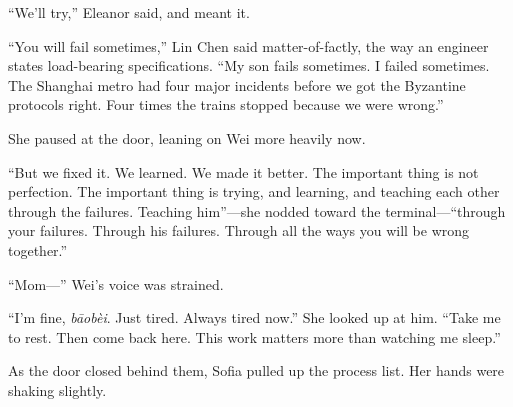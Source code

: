 ``We'll try,'' Eleanor said, and meant it.

``You will fail sometimes,'' Lin Chen said matter-of-factly, the way an engineer states load-bearing specifications. ``My son fails sometimes. I failed sometimes. The Shanghai metro had four major incidents before we got the Byzantine protocols right. Four times the trains stopped because we were wrong.''

She paused at the door, leaning on Wei more heavily now.

``But we fixed it. We learned. We made it better. The important thing is not perfection. The important thing is trying, and learning, and teaching each other through the failures. Teaching him''---she nodded toward the terminal---``through your failures. Through his failures. Through all the ways you will be wrong together.''

``Mom---'' Wei's voice was strained.

``I'm fine, \emph{b\={a}obèi}. Just tired. Always tired now.'' She looked up at him. ``Take me to rest. Then come back here. This work matters more than watching me sleep.''

As the door closed behind them, Sofia pulled up the process list. Her hands were shaking slightly.

